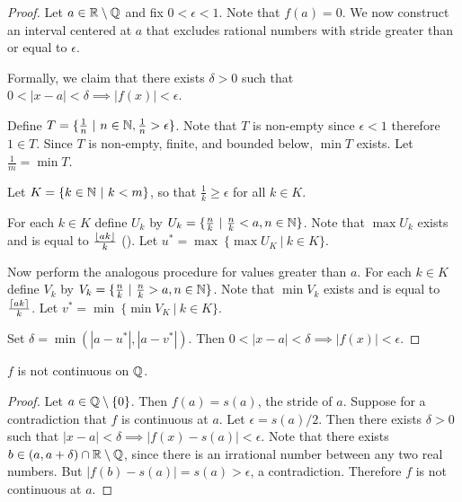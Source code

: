 \documentclass[12pt]{article}
\begin{document}
\begin{proof}
  Let $a \in \mathbb{R}\setminus\mathbb{Q}$ and fix $0 < \epsilon < 1$. Note that $f(a) = 0$. We now construct an
  interval centered at $a$ that excludes rational numbers with stride greater than or equal to
  $\epsilon$.

  Formally, we claim that there exists $\delta > 0$ such that
  $0 < |x - a| < \delta \implies |f(x)| < \epsilon$.

  Define $T = \{\frac{1}{n} ~|~ n \in \mathbb{N}, \frac{1}{n} > \epsilon\}$. Note that $T$ is non-empty
  since $\epsilon < 1$ therefore $1 \in T$. Since $T$ is non-empty, finite, and bounded below,
  $\min T$ exists. Let $\frac{1}{m} = \min T$.

  Let $K = \{k \in \mathbb{N} ~|~ k < m\}$, so that $\frac{1}{k} \geq \epsilon$ for all $k \in K$.

  For each $k \in K$ define $U_k$ by $U_k = \{\frac{n}{k} ~|~ \frac{n}{k} < a, n \in \mathbb{N}\}$. Note
  that $\max U_k$ exists and is equal to $\frac{\lfloor ak\rfloor}{k}$ (). Let
  $u^* = \max ~ \{\max U_K ~|~ k \in K\}$.

  Now perform the analogous procedure for values greater than $a$. For each $k \in K$ define $V_k$
  by $V_k = \{\frac{n}{k} ~|~ \frac{n}{k} > a, n \in \mathbb{N}\}$. Note that $\min V_k$ exists and is
  equal to $\frac{\lceil ak\rceil}{k}$. Let $v^* = \min ~ \{\min V_K ~|~ k \in K\}$.

  Set $\delta = \min(|a - u^*|, |a - v^*|)$. Then
  $0 < |x - a| < \delta \implies |f(x)| < \epsilon$.
\end{proof}

\begin{claim*}
  $f$ is not continuous on $\mathbb{Q}$.
\end{claim*}

\begin{proof}
  Let $a \in \mathbb{Q}\setminus\{0\}$. Then $f(a) = s(a)$, the stride of $a$. Suppose for a contradiction
  that $f$ is continuous at $a$. Let $\epsilon = s(a)/2$. Then there exists $\delta > 0$ such that
  $|x - a| < \delta \implies |f(x) - s(a)| < \epsilon$. Note that there exists
  $b \in (a, a + \delta) \cap \mathbb{R}\setminus\mathbb{Q}$, since there is an irrational number between any two
  real numbers. But $|f(b) - s(a)| = s(a) > \epsilon$, a contradiction. Therefore $f$ is not
  continuous at $a$.
\end{proof}
\end{document}
